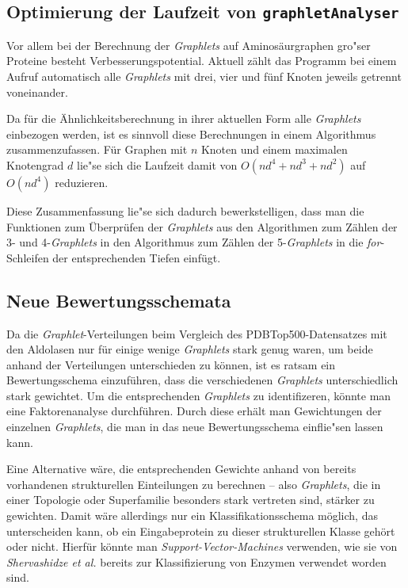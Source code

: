 \documentclass{report}
\begin{document}
\subsection{Optimierung der Laufzeit von \texttt{graphletAnalyser}}

Vor allem bei der Berechnung der \textit{Graphlets} auf Aminos\"aurgraphen gro"ser Proteine besteht Verbesserungspotential. Aktuell z\"ahlt das Programm bei einem Aufruf automatisch alle \textit{Graphlets} mit drei, vier und f\"unf Knoten jeweils getrennt voneinander.

Da f\"ur die \"Ahnlichkeitsberechnung in ihrer aktuellen Form alle \textit{Graphlets} einbezogen werden, ist es sinnvoll diese Berechnungen in einem Algorithmus zusammenzufassen. F\"ur Graphen mit $n$ Knoten und einem maximalen Knotengrad $d$ lie"se sich die Laufzeit damit von $O(nd^4+nd^3+nd^2)$ auf $O(nd^4)$ reduzieren.

Diese Zusammenfassung lie"se sich dadurch bewerkstelligen, dass man die Funktionen zum \"Uberpr\"ufen der \textit{Graphlets} aus den Algorithmen zum Z\"ahlen der 3- und 4-\textit{Graphlets} in den Algorithmus zum Z\"ahlen der 5-\textit{Graphlets} in die \textit{for}-Schleifen der entsprechenden Tiefen einf\"ugt.

\subsection{Neue Bewertungsschemata}

Da die \textit{Graphlet}-Verteilungen beim Vergleich des PDBTop500-Datensatzes mit den Aldolasen nur f\"ur einige wenige \textit{Graphlets} stark genug waren, um beide anhand der Verteilungen unterschieden zu k\"onnen, ist es ratsam ein Bewertungsschema einzuf\"uhren, dass die verschiedenen \textit{Graphlets} unterschiedlich stark gewichtet. Um die entsprechenden \textit{Graphlets} zu identifizeren, k\"onnte man eine Faktorenanalyse durchf\"uhren. Durch diese erh\"alt man Gewichtungen der einzelnen \textit{Graphlets}, die man in das neue Bewertungsschema einflie"sen lassen kann.

Eine Alternative w\"are, die entsprechenden Gewichte anhand von bereits vorhandenen strukturellen Einteilungen zu berechnen -- also \textit{Graphlets}, die in einer Topologie oder Superfamilie besonders stark vertreten sind, st\"arker zu gewichten. Damit w\"are allerdings nur ein Klassifikationsschema m\"oglich, das unterscheiden kann, ob ein Eingabeprotein zu dieser strukturellen Klasse geh\"ort oder nicht. Hierf\"ur k\"onnte man \textit{Support-Vector-Machines} verwenden, wie sie von \textit{Shervashidze et al.} \cite{sherv_graphlets} bereits zur Klassifizierung von Enzymen verwendet worden sind. 
\end{document}
